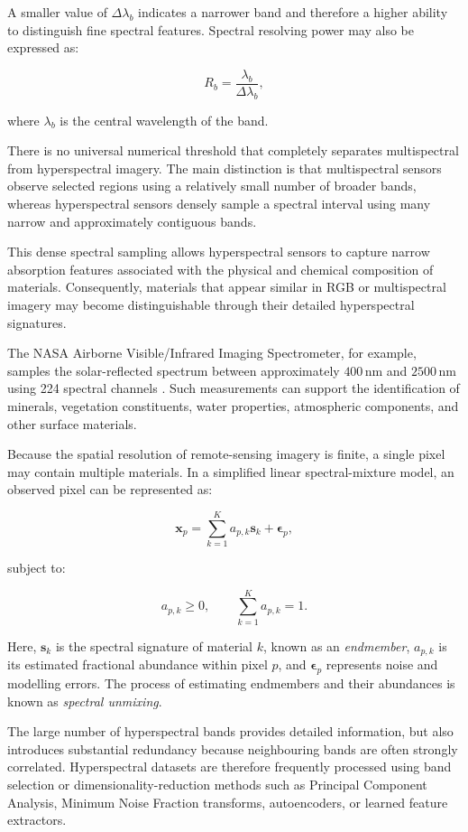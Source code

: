 \documentclass[11pt,a4paper]{article}
\begin{document}
A smaller value of \(\Delta\lambda_b\) indicates a narrower band and
therefore a higher ability to distinguish fine spectral features.
Spectral resolving power may also be expressed as:

\[
R_b =
\frac{\lambda_b}{\Delta\lambda_b},
\]

where \(\lambda_b\) is the central wavelength of the band.

There is no universal numerical threshold that completely separates
multispectral from hyperspectral imagery. The main distinction is that
multispectral sensors observe selected regions using a relatively small
number of broader bands, whereas hyperspectral sensors densely sample a
spectral interval using many narrow and approximately contiguous bands.

This dense spectral sampling allows hyperspectral sensors to capture
narrow absorption features associated with the physical and chemical
composition of materials. Consequently, materials that appear similar
in RGB or multispectral imagery may become distinguishable through their
detailed hyperspectral signatures.

The NASA Airborne Visible/Infrared Imaging Spectrometer, for example,
samples the solar-reflected spectrum between approximately
\(400\,\mathrm{nm}\) and \(2500\,\mathrm{nm}\) using 224 spectral
channels \cite{jpl_imaging_spectroscopy}. Such measurements can support
the identification of minerals, vegetation constituents, water
properties, atmospheric components, and other surface materials.

Because the spatial resolution of remote-sensing imagery is finite, a
single pixel may contain multiple materials. In a simplified linear
spectral-mixture model, an observed pixel can be represented as:

\[
\mathbf{x}_p
=
\sum_{k=1}^{K}
a_{p,k}\mathbf{s}_k
+
\boldsymbol{\epsilon}_p,
\]

subject to:

\[
a_{p,k}\geq 0,
\qquad
\sum_{k=1}^{K}a_{p,k}=1.
\]

Here, \(\mathbf{s}_k\) is the spectral signature of material \(k\),
known as an \textit{endmember}, \(a_{p,k}\) is its estimated fractional
abundance within pixel \(p\), and \(\boldsymbol{\epsilon}_p\) represents
noise and modelling errors. The process of estimating endmembers and
their abundances is known as \textit{spectral unmixing}.

The large number of hyperspectral bands provides detailed information,
but also introduces substantial redundancy because neighbouring bands
are often strongly correlated. Hyperspectral datasets are therefore
frequently processed using band selection or dimensionality-reduction
methods such as Principal Component Analysis, Minimum Noise Fraction
transforms, autoencoders, or learned feature extractors.
\end{document}

